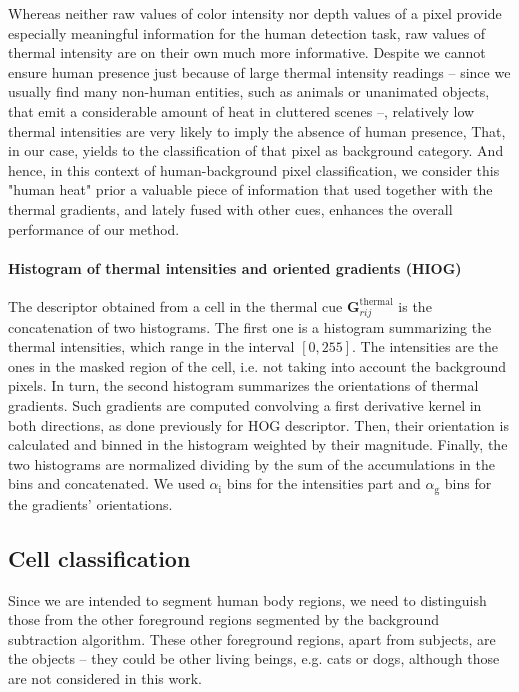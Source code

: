 \documentclass[10pt,twocolumn,letterpaper]{article}
\begin{document}
Whereas neither raw values of color intensity nor depth values of a pixel provide especially meaningful information for the human detection task, raw values of thermal intensity are on their own much more informative. Despite we cannot ensure human presence just because of large thermal intensity readings -- since we usually find many non-human entities, such as animals or unanimated objects, that emit a considerable amount of heat in cluttered scenes --, relatively low thermal intensities are very likely to imply the absence of human presence, That, in our case, yields to the classification of that pixel as background category. And hence, in this context of human-background pixel classification, we consider this "human heat" prior a valuable piece of information that used together with the thermal gradients, and lately fused with other cues, enhances the overall performance of our method.

\paragraph{Histogram of thermal intensities and oriented gradients (HIOG)} 
The descriptor obtained from a cell in the thermal cue $\mathbf{G}_{rij}^{\mathrm{thermal}}$ is the concatenation of two histograms. The first one is a histogram summarizing the thermal intensities, which range in the interval $[0, 255]$. The intensities are the ones in the masked region of the cell, i.e. not taking into account the background pixels. In turn, the second histogram summarizes the orientations of thermal gradients. Such gradients are computed convolving a first derivative kernel in both directions, as done previously for HOG descriptor. Then, their orientation is calculated and binned in the histogram weighted by their magnitude. Finally, the two histograms are normalized dividing by the sum of the accumulations in the bins and concatenated. We used $\alpha_{\mathrm{i}}$ bins for the intensities part and $\alpha_{\mathrm{g}}$ bins for the gradients' orientations.


\subsection{Cell classification}
Since we are intended to segment human body regions, we need to distinguish those from the other foreground regions segmented by the background subtraction algorithm. These other foreground regions, apart from subjects, are the objects -- they could be other living beings, e.g. cats or dogs, although those are not considered in this work.
\end{document}
